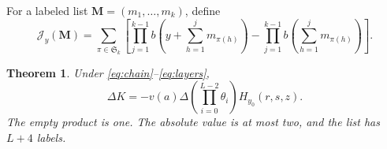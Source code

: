 \documentclass[11pt,a4paper]{amsart}
\numberwithin{equation}{section}
\theoremstyle{plain}
\newtheorem{theorem}{Theorem}[section]
\theoremstyle{definition}
\newcommand{\Jcal}{\mathcal J}
\begin{document}
For a labeled list \(\mathbf M=(m_1,\ldots,m_k)\), define
\begin{equation}\label{eq:J}
\Jcal_y(\mathbf M)=\sum_{\pi\in\mathfrak S_k}\left[
\prod_{j=1}^{k-1}b\left(y+\sum_{h=1}^jm_{\pi(h)}\right)
-\prod_{j=1}^{k-1}b\left(\sum_{h=1}^jm_{\pi(h)}\right)\right].
\end{equation}

\begin{theorem}\label{thm:nested}
Under \eqref{eq:chain}--\eqref{eq:layers},
\begin{equation}\label{eq:nested-product}
\Delta K=-v(a)\Delta
\left(\prod_{i=0}^{L-2}\theta_i\right)H_{y_0}(r,s,z).
\end{equation}
The empty product is one.  The absolute value is at most two, and the list
has \(L+4\) labels.
\end{theorem}
\end{document}
